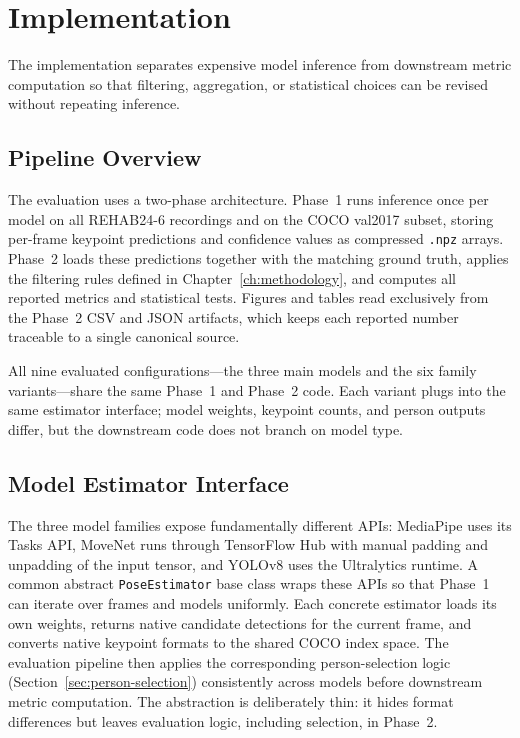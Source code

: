 \chapter{Implementation}
\label{ch:implementation}

The implementation separates expensive model inference from downstream metric computation so that filtering, aggregation, or statistical choices can be revised without repeating inference.

\section{Pipeline Overview}
\label{sec:architecture}

The evaluation uses a two-phase architecture. Phase~1 runs inference once per model on all REHAB24-6 recordings and on the COCO val2017 subset, storing per-frame keypoint predictions and confidence values as compressed \texttt{.npz} arrays. Phase~2 loads these predictions together with the matching ground truth, applies the filtering rules defined in Chapter~\ref{ch:methodology}, and computes all reported metrics and statistical tests. Figures and tables read exclusively from the Phase~2 CSV and JSON artifacts, which keeps each reported number traceable to a single canonical source.

All nine evaluated configurations---the three main models and the six family variants---share the same Phase~1 and Phase~2 code. Each variant plugs into the same estimator interface; model weights, keypoint counts, and person outputs differ, but the downstream code does not branch on model type.

\section{Model Estimator Interface}
\label{sec:model-abstraction}

The three model families expose fundamentally different APIs: MediaPipe uses its Tasks API, MoveNet runs through TensorFlow Hub with manual padding and unpadding of the input tensor, and YOLOv8 uses the Ultralytics runtime. A common abstract \texttt{PoseEstimator} base class wraps these APIs so that Phase~1 can iterate over frames and models uniformly. Each concrete estimator loads its own weights, returns native candidate detections for the current frame, and converts native keypoint formats to the shared COCO index space. The evaluation pipeline then applies the corresponding person-selection logic (Section~\ref{sec:person-selection}) consistently across models before downstream metric computation. The abstraction is deliberately thin: it hides format differences but leaves evaluation logic, including selection, in Phase~2.

